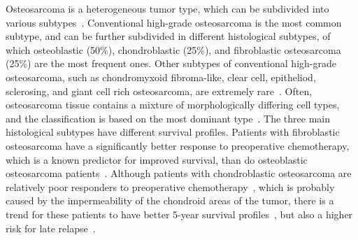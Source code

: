 Osteosarcoma is a heterogeneous tumor type, which
can be subdivided into various subtypes~\cite{mohseny2008bone}. Conventional
high\hyp{}grade osteosarcoma is the most common
subtype, and can be further subdivided in different histological
subtypes, of which osteoblastic (50\%), chondroblastic
(25\%), and fibroblastic osteosarcoma (25\%) are
the most frequent ones. Other subtypes of conventional
high\hyp{}grade osteosarcoma, such as chondromyxoid
fibroma\hyp{}like, clear cell, epitheliod, sclerosing, and giant
cell rich osteosarcoma, are extremely rare~\cite{raymond2002conventional}. Often,
osteosarcoma tissue contains a mixture of morphologically
differing cell types, and the classification is based
on the most dominant type~\cite{hauben2002does}. The three main histological
subtypes have different survival profiles. Patients
with fibroblastic osteosarcoma have a significantly better
response to preoperative chemotherapy, which is a
known predictor for improved survival, than do osteoblastic
osteosarcoma patients~\cite{huvos1991bone}. Although patients with
chondroblastic osteosarcoma are relatively poor responders
to preoperative chemotherapy~\cite{hauben2002does,bacci1998predictive}, which is probably
caused by the impermeability of the chondroid
areas of the tumor, there is a trend for these patients to
have better 5-year survival profiles~\cite{hauben2002does}, but also a higher
risk for late relapse~\cite{hauben2006clinico}.

